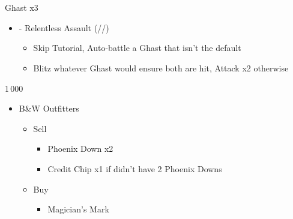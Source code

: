 \chapter{}

\renewcommand{\first}{[1] - Relentless Assault (\com/\rav/\rav)}

\begin{battle}{Ghast x3}
\begin{itemize}
    \item \first
    \begin{itemize}
        \item Skip Tutorial, Auto-battle a Ghast that isn't the default
        \item Blitz whatever Ghast would ensure both are hit, Attack x2 otherwise
    \end{itemize}
\end{itemize}
\end{battle}

\begin{shop}{1\,000}
\begin{itemize}
    \item B\&W Outfitters
    \begin{itemize}
        \item Sell
        \begin{itemize}
            \item Phoenix Down x2
            \item Credit Chip x1 if didn't have 2 Phoenix Downs
        \end{itemize}
        \item Buy
        \begin{itemize}
            \item Magician's Mark
        \end{itemize}
    \end{itemize}
\end{itemize}
\end{shop}


